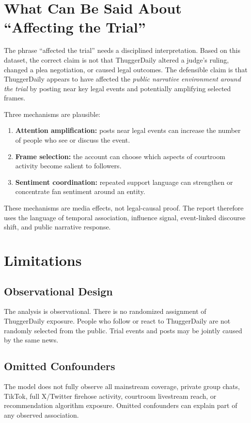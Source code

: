\documentclass[12pt]{article}
\begin{document}
\section{What Can Be Said About ``Affecting the Trial''}
The phrase ``affected the trial'' needs a disciplined interpretation. Based on this dataset, the correct claim is not that ThuggerDaily altered a judge's ruling, changed a plea negotiation, or caused legal outcomes. The defensible claim is that ThuggerDaily appears to have affected the \emph{public narrative environment around the trial} by posting near key legal events and potentially amplifying selected frames.

Three mechanisms are plausible:
\begin{enumerate}[leftmargin=*]
\item \textbf{Attention amplification:} posts near legal events can increase the number of people who see or discuss the event.
\item \textbf{Frame selection:} the account can choose which aspects of courtroom activity become salient to followers.
\item \textbf{Sentiment coordination:} repeated support language can strengthen or concentrate fan sentiment around an entity.
\end{enumerate}

These mechanisms are media effects, not legal-causal proof. The report therefore uses the language of temporal association, influence signal, event-linked discourse shift, and public narrative response.

\newpage
\section{Limitations}
\subsection{Observational Design}
The analysis is observational. There is no randomized assignment of ThuggerDaily exposure. People who follow or react to ThuggerDaily are not randomly selected from the public. Trial events and posts may be jointly caused by the same news.

\subsection{Omitted Confounders}
The model does not fully observe all mainstream coverage, private group chats, TikTok, full X/Twitter firehose activity, courtroom livestream reach, or recommendation algorithm exposure. Omitted confounders can explain part of any observed association.
\end{document}
